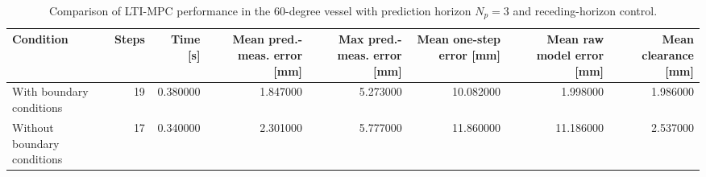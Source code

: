\begin{table}
\caption{Comparison of LTI-MPC performance in the 60-degree vessel with prediction horizon $N_p=3$ and receding-horizon control.}
\label{tab:lti_mpc_boundary_comparison}
\begin{tabular}{lrrrrrrr}
\toprule
Condition & Steps & Time [s] & Mean pred.-meas. error [mm] & Max pred.-meas. error [mm] & Mean one-step error [mm] & Mean raw model error [mm] & Mean clearance [mm] \\
\midrule
With boundary conditions & 19 & 0.380000 & 1.847000 & 5.273000 & 10.082000 & 1.998000 & 1.986000 \\
Without boundary conditions & 17 & 0.340000 & 2.301000 & 5.777000 & 11.860000 & 11.186000 & 2.537000 \\
\bottomrule
\end{tabular}
\end{table}
